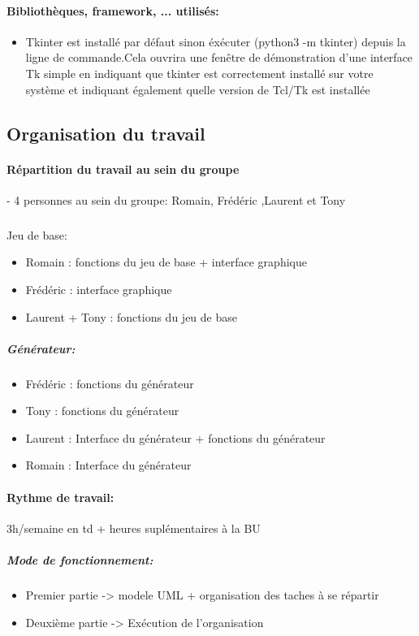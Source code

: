 \documentclass[a4paper]{article}
\begin{document}
\paragraph*{Bibliothèques, framework, ... utilisés:}
\begin{itemize}
\item Tkinter est installé par défaut sinon éxécuter (python3 -m tkinter) depuis la ligne de commande.Cela ouvrira une fenêtre de démonstration d'une interface Tk simple en indiquant que tkinter est correctement installé sur votre système et indiquant également quelle version de Tcl/Tk est installée\\
\end{itemize}

\subsection{Organisation du travail}
\paragraph{Répartition du travail au sein du groupe}

  - 4 personnes au sein du groupe: Romain, Frédéric ,Laurent et Tony
  \subparagraph{}
  Jeu de base:
  \begin{itemize}
  \item Romain : fonctions du jeu de base + interface graphique
  \item Frédéric : interface graphique
  \item Laurent + Tony : fonctions du jeu de base
  \end{itemize}

  \subparagraph{Générateur:}

  \begin{itemize}
    \item Frédéric : fonctions du générateur
    \item Tony : fonctions du générateur
    \item Laurent : Interface du générateur + fonctions du générateur 
    \item Romain : Interface du générateur
  \end{itemize}
   
   
\paragraph{Rythme de travail:} 3h/semaine en td + heures suplémentaires à la BU \\
 \subparagraph{Mode de fonctionnement:}
 \begin{itemize}
 \item Premier partie ->   modele UML + organisation des taches à se répartir\\
 \item Deuxième partie ->  Exécution de l'organisation  
 \end{itemize}
\end{document}
